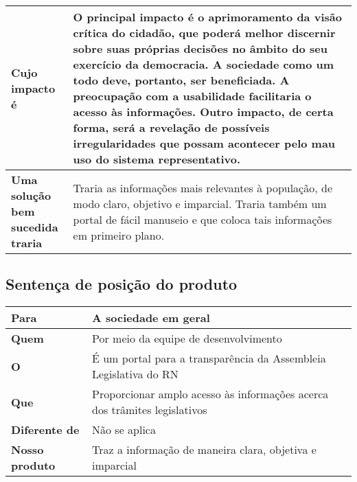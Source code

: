 \documentclass[12pt, a4paper]{article}
\begin{document}
\begin{tabu}{X[1] | X[3]}
                \textbf{Cujo impacto é} &
                O principal impacto é o aprimoramento da visão crítica do
                cidadão, que poderá melhor discernir sobre suas próprias
                decisões no âmbito do seu exercício da democracia. A sociedade
                como um todo deve, portanto, ser beneficiada. A preocupação com
                a usabilidade facilitaria o acesso às informações.  Outro
                impacto, de certa forma, será a revelação de possíveis
                irregularidades que possam acontecer pelo mau uso do sistema
                representativo.
                \\ \hline

                \textbf{Uma solução bem \newline sucedida traria} &
                Traria as informações mais relevantes à população, de modo
                claro, objetivo e imparcial. Traria também um portal de fácil
                manuseio e que coloca tais informações em primeiro plano.
                \\ \hline

            \end{tabu}

        \subsection{Sentença de posição do produto}
            \begin{tabu}{X[1] | X[3]}
                \hline
                \textbf{Para} &
                A sociedade em geral
                \\ \hline
                \textbf{Quem} &
                Por meio da equipe de desenvolvimento
                \\ \hline
                \textbf{O} &
                É um portal para a transparência da Assembleia Legislativa do RN
                \\ \hline
                \textbf{Que} &
                Proporcionar amplo acesso às informações acerca dos trâmites
                legislativos
                \\ \hline
                \textbf{Diferente de} &
                Não se aplica
                \\ \hline
                \textbf{Nosso produto} &
                Traz a informação de maneira clara, objetiva e imparcial
                \\ \hline
            \end{tabu}
\end{document}
